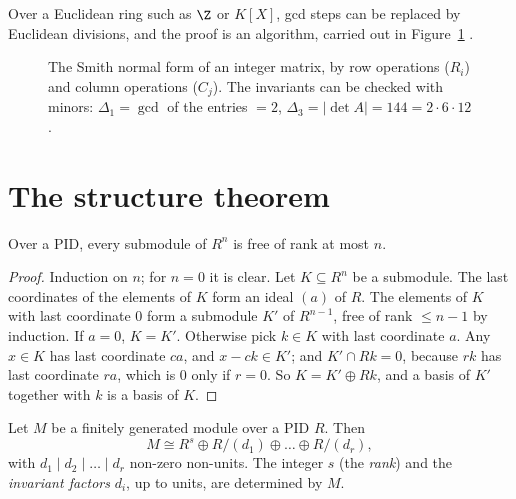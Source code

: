 Over a Euclidean ring such as $\Z$ or $K[X]$, gcd steps can be replaced by Euclidean divisions, and the proof is an algorithm, carried out in Figure~\ref{fig:smith} .

\begin{figure}[ht]
\centering
{}
\caption{The Smith normal form of an integer matrix, by row operations ($R_i$) and column operations ($C_j$). The invariants can be checked with minors: $\Delta_1=\gcd$ of the entries $=2$, $\Delta_3=|\det A|=144=2\cdot6\cdot12$.}
\label{fig:smith}
\end{figure}

\section{The structure theorem}

\begin{lemma}\label{lem:subfree}
Over a PID, every submodule of $R^n$ is free of rank at most $n$.
\end{lemma}
\begin{proof}
Induction on $n$; for $n=0$ it is clear. Let $K\subseteq R^n$ be a submodule. The last coordinates of the elements of $K$ form an ideal $(a)$ of $R$. The elements of $K$ with last coordinate $0$ form a submodule $K'$ of $R^{n-1}$, free of rank $\le n-1$ by induction. If $a=0$, $K=K'$. Otherwise pick $k\in K$ with last coordinate $a$. Any $x\in K$ has last coordinate $ca$, and $x-ck\in K'$; and $K'\cap Rk=0$, because $rk$ has last coordinate $ra$, which is $0$ only if $r=0$. So $K=K'\oplus Rk$, and a basis of $K'$ together with $k$ is a basis of $K$.
\end{proof}

\begin{theorem}\label{thm:structure}
Let $M$ be a finitely generated module over a PID $R$. Then
\[
M\cong R^s\oplus R/(d_1)\oplus\dots\oplus R/(d_r),
\]
with $d_1\mid d_2\mid\dots\mid d_r$ non-zero non-units. The integer $s$ (the \emph{rank}) and the \emph{invariant factors} $d_i$, up to units, are determined by $M$.
\end{theorem}

